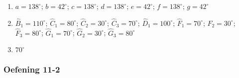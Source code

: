 {\begin{multicols}{3}
\begin{enumerate}[label=\textbf{\arabic*}.]
\item %
    $a=138^{\circ}$; $b=42^{\circ}$; $c=138^{\circ}$; $d=138^{\circ}$; $e=42^{\circ}$; $f=138^{\circ}$; $g=42^{\circ}$
\item %
 $\hat{B}_1=110^{\circ}$; $\hat{C}_1=80^{\circ}$; $\hat{C}_2=30^{\circ}$; $\hat{C}_3=70^{\circ}$; $\hat{D}_1=100^{\circ}$; $\hat{F}_1=70^{\circ}$; $\hat{F}_2=30^{\circ}$; $\hat{F}_3=80^{\circ}$; $\hat{G}_1=70^{\circ}$; $\hat{G}_2=30^{\circ}$; $\hat{G}_3=80^{\circ}$
\item $70^{\circ}$%
% 
\end{enumerate}

\subsubsection*{Oefening 11-2} %


\end{multicols}}
